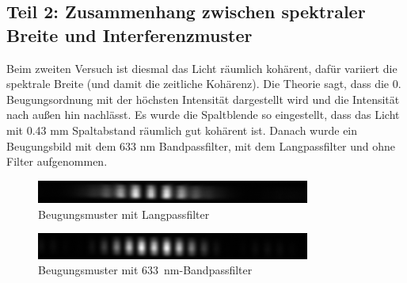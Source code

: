 \documentclass{article}
\begin{document}
%


\newpage
\subsection{Teil 2: Zusammenhang zwischen spektraler Breite und Interferenzmuster}

Beim zweiten Versuch ist diesmal das Licht räumlich kohärent, dafür variiert die spektrale Breite (und damit die zeitliche Kohärenz). Die Theorie sagt, dass die 0. Beugungsordnung mit der höchsten Intensität dargestellt wird und die Intensität nach außen hin nachlässt. Es wurde die Spaltblende so eingestellt, dass das Licht mit 0.43 mm Spaltabstand räumlich gut kohärent ist. Danach wurde ein Beugungsbild mit dem 633 nm Bandpassfilter, mit dem Langpassfilter und ohne Filter aufgenommen. 

\begin{figure}[H]
\centering
\caption{Beugungsmuster mit Langpassfilter}
\includegraphics[width=9cm]{moodle/img_LP.png}
\end{figure}

\begin{figure}[H]
\centering
\caption{Beugungsmuster mit 633~nm-Bandpassfilter}
\includegraphics[width=9cm]{moodle/img_633BP.png}
\end{figure}
\end{document}
